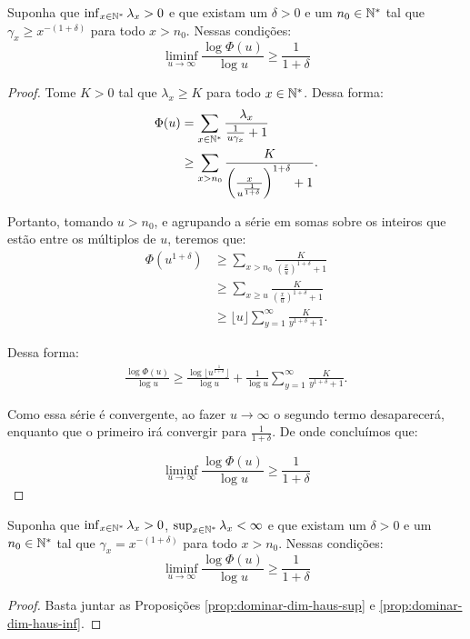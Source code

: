 \begin{proposicao}
\label{prop:dominar-dim-haus-inf}
  Suponha que $\inf_{x\in{\mathbb{N^*}}}\lambda_x  > 0$ e que existam um
  $\delta>0$ e um $n_0 \in {\mathbb{N^*}}$ tal que $\gamma_x \geq x^{-(1+\delta)}$
  para todo $x > n_0$. Nessas condições:
  \begin{equation}
    \liminf_{u \to \infty} \frac{\log \Phi(u)}{\log u}  \geq \frac{1}{1+\delta}
  \end{equation}
\end{proposicao}

\begin{proof}
  Tome $K > 0$ tal que $\lambda_x \geq K$ para todo $x \in {\mathbb{N^*}}$. Dessa
  forma:
  \begin{align*}
    \Phi(u) &= \sum_{x \in {\mathbb{N^*}}} \frac{\lambda_x}{\frac{1}{u\gamma_x} +
      1}\\
    &\geq \sum_{x > n_0}
    \frac{K}{\left(\frac{x}{u^{\frac{1}{1+\delta}}}\right)^{1+\delta} +1}.
  \end{align*}

  Portanto, tomando $u > n_0$, e agrupando a série em somas sobre os inteiros
  que estão entre os múltiplos de $u$, teremos que:
  \begin{align*}
    \Phi(u^{1+\delta}) 
    &\geq \sum_{x > n_0}
    \frac{K}{\left(\frac{x}{u}\right)^{1+\delta} +1}\\
    &\geq \sum_{x \geq u}
    \frac{K}{\left(\frac{x}{u}\right)^{1+\delta} +1}\\
    &\geq \lfloor u \rfloor \sum_{y = 1}^{\infty}
    \frac{K}{y^{1+\delta} + 1}.
  \end{align*}

  Dessa forma:
  \begin{align*}
    \frac{\log \Phi(u)}{\log u} \geq \frac{\log\lfloor
      u^{\frac{1}{1+\delta}} \rfloor }{\log u} + 
    \frac{1}{\log u} \sum_{y = 1}^{\infty}
    \frac{K}{y^{1+\delta} + 1}.
  \end{align*}

  Como essa série é convergente, ao fazer $u \to \infty$ o segundo
  termo desaparecerá, enquanto que o primeiro irá convergir para
  $\frac{1}{1+\delta}$. De onde concluímos que:

  \begin{displaymath}
    \liminf_{u \to \infty} \frac{\log \Phi (u)}{\log u} \geq \frac{1}{1+\delta}
  \end{displaymath}
\end{proof}

\begin{corolario}
  \label{prop:igualar-dim-haus}
  Suponha que $\inf_{x \in {\mathbb{N^*}}} \lambda_x > 0$, $\sup_{x \in {\mathbb{N^*}}}
  \lambda_x < \infty$ e que existam um $\delta > 0$ e um $n_0 \in {\mathbb{N^*}}$
  tal que $\gamma_x = x^{-(1+\delta)}$ para todo $x > n_0$.  Nessas
  condições:
  \begin{displaymath}
    \liminf_{u \to \infty} \frac{\log \Phi(u)}{\log u}  \geq \frac{1}{1+\delta}
  \end{displaymath}
\end{corolario}
\begin{proof}
  Basta juntar as Proposições \ref{prop:dominar-dim-haus-sup} e
  \ref{prop:dominar-dim-haus-inf}.
\end{proof}

